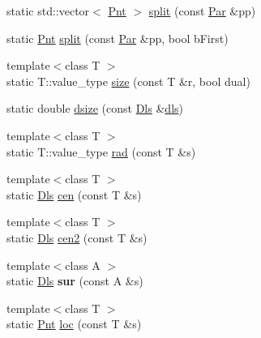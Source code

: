 \begin{DoxyCompactItemize}
\item 
static std\-::vector$<$ \hyperlink{namespacevsr_a2d05beb9721c5d9211b479af6d47222d}{Pnt} $>$ \hyperlink{structvsr_1_1_ro_a338737df98f8a2bba7de88a1d4f332bf}{split} (const \hyperlink{namespacevsr_ae046793ece205351429a6346a66fd6eb}{Par} \&pp)
\item 
static \hyperlink{namespacevsr_a2d05beb9721c5d9211b479af6d47222d}{Pnt} \hyperlink{structvsr_1_1_ro_a7f71d2c98fb029445fd54f738be3a872}{split} (const \hyperlink{namespacevsr_ae046793ece205351429a6346a66fd6eb}{Par} \&pp, bool b\-First)
\item 
{\footnotesize template$<$class T $>$ }\\static T\-::value\-\_\-type \hyperlink{structvsr_1_1_ro_ad511f6aa6bca8dbf4939b0c743f6589a}{size} (const T \&r, bool dual)
\item 
static double \hyperlink{structvsr_1_1_ro_a5644c5a2f2ae98f86c1235e566e5ff28}{dsize} (const \hyperlink{classvsr_1_1_m_v}{Dls} \&\hyperlink{structvsr_1_1_ro_a38ad7d450cb8387524c17fda3a3064f2}{dls})
\item 
{\footnotesize template$<$class T $>$ }\\static T\-::value\-\_\-type \hyperlink{structvsr_1_1_ro_a1e55bb451e64e33b644c97dd6a19f029}{rad} (const T \&s)
\item 
{\footnotesize template$<$class T $>$ }\\static \hyperlink{classvsr_1_1_m_v}{Dls} \hyperlink{structvsr_1_1_ro_a29763a7a96a9d5c4bd081687e6ddf987}{cen} (const T \&s)
\item 
{\footnotesize template$<$class T $>$ }\\static \hyperlink{classvsr_1_1_m_v}{Dls} \hyperlink{structvsr_1_1_ro_a4e605409c0aeec13a0c6eb353021199f}{cen2} (const T \&s)
\item 
\hypertarget{structvsr_1_1_ro_a71fbe9fe9944a93927087de744c167aa}{{\footnotesize template$<$class A $>$ }\\static \hyperlink{classvsr_1_1_m_v}{Dls} {\bfseries sur} (const A \&s)}\label{structvsr_1_1_ro_a71fbe9fe9944a93927087de744c167aa}

\item 
\hypertarget{structvsr_1_1_ro_aab2dd2a509f27df1a33ccecd60d4c2aa}{{\footnotesize template$<$class T $>$ }\\static \hyperlink{namespacevsr_a2d05beb9721c5d9211b479af6d47222d}{Pnt} \hyperlink{structvsr_1_1_ro_aab2dd2a509f27df1a33ccecd60d4c2aa}{loc} (const T \&s)}\label{structvsr_1_1_ro_aab2dd2a509f27df1a33ccecd60d4c2aa}


\end{DoxyCompactItemize}

